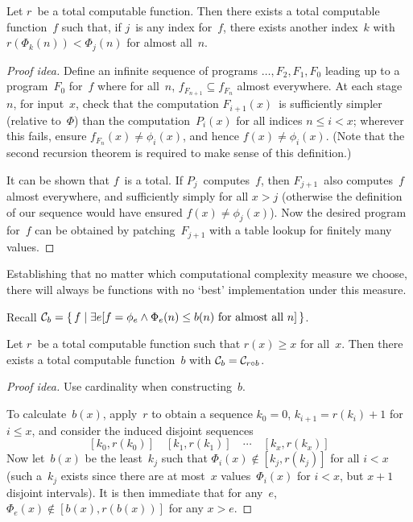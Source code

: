 \begin{thm}
Let \(r\)~be a total computable function. Then there exists a total computable function~\(f\) such that, if \(j\)~is any index for~\(f\), there exists another index~\(k\) with \(r(\Phi_k(n))<\Phi_j(n)\) for almost all~\(n\).
\end{thm}
\begin{proof}[Proof idea]
Define an infinite sequence of programs \(\ldots,F_2,F_1,F_0\) leading up to a program~\(F_0\) for~\(f\) where for all~\(n\), \(f_{F_{n+1}}\subseteq f_{F_n}\) almost everywhere. At each stage~\(n\), for input~\(x\), check that the computation \(F_{i+1}(x)\)~is sufficiently simpler (relative to~\(\Phi\)) than the computation~\(P_i(x)\) for all indices \(n\le i<x\); wherever this fails, ensure \(f_{F_n}(x)\ne\phi_i(x)\), and hence \(f(x)\ne\phi_i(x)\). (Note that the second recursion theorem is required to make sense of this definition.)

It can be shown that \(f\)~is a total. If \(P_j\)~computes~\(f\), then \(F_{j+1}\)~also computes~\(f\) almost everywhere, and sufficiently simply for all \(x>j\) (otherwise the definition of our sequence would have ensured \(f(x)\ne\phi_j(x)\)). Now the desired program for~\(f\) can be obtained by patching~\(F_{j+1}\) with a table lookup for finitely many values.
\end{proof}
\begin{app}
Establishing that no matter which computational complexity measure we choose, there will always be functions with no `best' implementation under this measure.
\end{app}

\noindent Recall \(\mathcal{C}_b=\{\,f\mid \exists e[f=\phi_e\land\Phi_e(n)\le b(n)\text{ for almost all }n]\,\}\).

\begin{thm}
Let \(r\)~be a total computable function such that \(r(x)\ge x\) for all~\(x\). Then there exists a total computable function~\(b\) with \(\mathcal{C}_b=\mathcal{C}_{r\circ b}\).
\end{thm}
\begin{proof}[Proof idea]
Use cardinality when constructing~\(b\).

To calculate~\(b(x)\), apply~\(r\) to obtain a sequence \(k_0=0\), \(k_{i+1}=r(k_i)+1\) for \(i\le x\), and consider the induced disjoint sequences
\[[k_0,r(k_0)]\quad[k_1,r(k_1)]\quad\cdots\quad[k_x,r(k_x)]\]
Now let~\(b(x)\) be the least~\(k_j\) such that \(\Phi_i(x)\not\in[k_j,r(k_j)]\) for all \(i<x\) (such a~\(k_j\) exists since there are at most~\(x\) values~\(\Phi_i(x)\) for \(i<x\), but \(x+1\) disjoint intervals). It is then immediate that for any~\(e\), \(\Phi_e(x)\not\in[b(x),r(b(x))]\) for any \(x>e\).
\end{proof}


